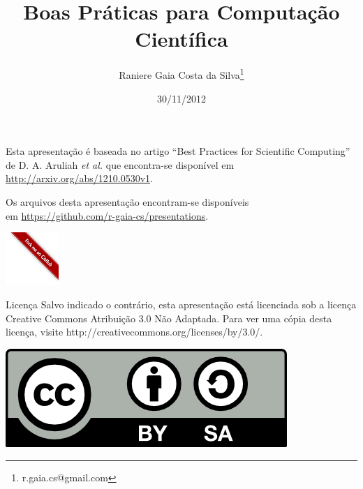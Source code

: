 \documentclass[11pt]{beamer}
\begin{document}
\title[Boas Práticas para Comp. Científica]{Boas Práticas para Computação Científica}
\author[Raniere Silva]{Raniere Gaia Costa da
Silva\footnote{r.gaia.cs@gmail.com}}
\date{30/11/2012}

\begin{frame}
    \maketitle
\end{frame}

\begin{frame}
    Esta apresentação é baseada no artigo ``Best Practices for Scientific
    Computing'' de D. A. Aruliah \textit{et al.} que encontra-se disponível em
    \url{http://arxiv.org/abs/1210.0530v1}.

    \begin{block}{}
        Os arquivos desta apresentação encontram-se disponíveis \\
        em \url{https://github.com/r-gaia-cs/presentations}. \\
        \vspace{-33pt}
        \begin{flushright}
            \includegraphics[height=2cm]{../figures/forkme_right_red.png}
        \end{flushright}
    \end{block}

    \begin{block}{Licença}
        Salvo indicado o contrário, esta apresentação está licenciada sob a licença
        Creative Commons Atribuição 3.0 Não Adaptada. Para ver uma cópia desta
        licença, visite http://creativecommons.org/licenses/by/3.0/.
        \begin{center}
            \includegraphics{../figures/cc-by-sa.png}
        \end{center}
    \end{block}
\end{frame}
\end{document}
